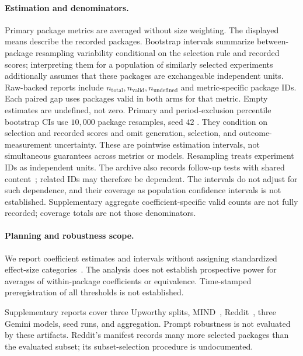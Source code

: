 \paragraph{Estimation and denominators.}
Primary package metrics are averaged without size weighting. The displayed means describe the recorded
packages. Bootstrap intervals summarize between-package resampling variability conditional on
the selection rule and recorded scores; interpreting them for a population of similarly selected
experiments additionally assumes that these packages are exchangeable independent units. Raw-backed reports include
$n_{\mathrm{total}},n_{\mathrm{valid}},n_{\mathrm{undefined}}$ and metric-specific package IDs.
Each paired gap uses packages valid in both arms for that metric. Empty estimates are undefined,
not zero. Primary and period-exclusion percentile bootstrap CIs use $10{,}000$ package resamples, seed $42$
\citep{efron1979bootstrap}. They condition on selection and recorded scores and omit generation,
selection, and outcome-measurement uncertainty. These are pointwise estimation intervals, not
simultaneous guarantees across metrics or models. Resampling treats experiment IDs as independent
units. The archive also records follow-up tests with shared content~\citep{matiasUpworthy};
related IDs may therefore be dependent. The intervals do not adjust for such dependence, and
their coverage as population confidence intervals is not established. Supplementary aggregate coefficient-specific valid counts
are not fully recorded; coverage totals are not those denominators.

\paragraph{Planning and robustness scope.}
We report coefficient estimates and intervals without assigning standardized effect-size
categories~\citep{cohen1988power}. The analysis does not establish prospective power for
averages of within-package coefficients or equivalence. Time-stamped preregistration of all thresholds is not established.

Supplementary reports cover three Upworthy splits, MIND~\citep{wu2020mind},
Reddit~\citep{lakkaraju2013name}, three Gemini models, seed runs, and aggregation. Prompt robustness is not evaluated by these artifacts. Reddit's manifest records many
more selected packages than the evaluated subset; its subset-selection procedure is undocumented.

